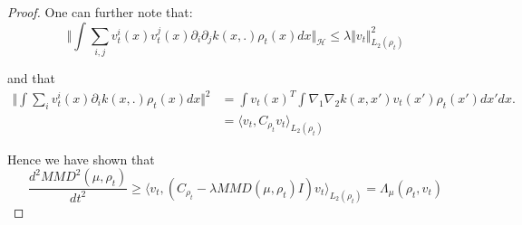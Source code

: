 \begin{proof}
One can further note that:
\[
\Vert\int\sum_{i,j}v_{t}^{i}(x)v_{t}^{j}(x)\partial_{i}\partial_{j}k(x,.)\rho_{t}(x)dx\Vert_{\mathcal{H}}\leq\lambda\Vert v_{t}\Vert_{L_{2}(\rho_{t})}^{2}
\]

and that 
\begin{align*}
\Vert\int\sum_{i}v_{t}^{i}(x)\partial_{i}k(x,.)\rho_{t}(x)dx\Vert^{2} & =\int v_{t}(x)^{T}\int\nabla_{1}\nabla_{2}k(x,x')v_{t}(x')\rho_{t}(x')dx'dx.\\
 & =\langle v_{t},C_{\rho_{t}}v_{t}\rangle_{L_{2}(\rho_{t})}
\end{align*}

Hence we have shown that 
\[
\frac{d^{2}MMD^{2}(\mu,\rho_{t})}{dt^{2}}\geq\langle v_{t},(C_{\rho_{t}}-\lambda MMD(\mu,\rho_{t})I)v_{t}\rangle_{L_{2}(\rho_{t})}=\Lambda_{\mu}(\rho_{t},v_{t})
\]
\end{proof}



